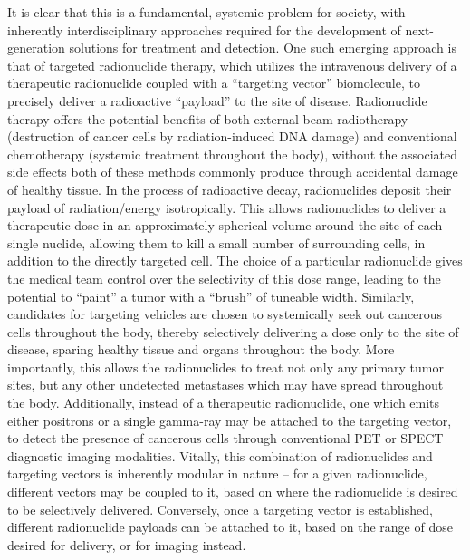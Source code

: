 It is clear that this is a fundamental, systemic problem for society, with inherently interdisciplinary approaches required for the development of next-generation solutions for treatment and detection.  One such emerging approach is that of targeted radionuclide therapy, which utilizes the intravenous delivery of a therapeutic radionuclide coupled with a “targeting vector” biomolecule, to precisely deliver a radioactive “payload” to the site of disease. Radionuclide therapy offers the potential benefits of both external beam radiotherapy (destruction of cancer cells by radiation-induced DNA damage) and conventional chemotherapy (systemic treatment throughout the body), without the associated side effects both of these methods commonly produce through accidental damage of healthy tissue.  In the process of radioactive decay, radionuclides deposit their payload of radiation/energy isotropically. This allows radionuclides to deliver a therapeutic dose in an approximately spherical volume around the site of each single nuclide, allowing them to kill a small number of surrounding cells, in addition to the directly targeted cell. The choice of a particular radionuclide gives the medical team control over the selectivity of this dose range, leading to the potential to “paint” a tumor with a “brush” of tuneable width. Similarly, candidates for targeting vehicles are chosen to systemically seek out cancerous cells throughout the body, thereby selectively delivering a dose only to the site of disease, sparing healthy tissue and organs throughout the body. More importantly, this allows the radionuclides to treat not only any primary tumor sites, but any other undetected metastases which may have spread throughout the body. Additionally, instead of a therapeutic radionuclide, one which emits either positrons or a single gamma-ray may be attached to the targeting vector, to detect the presence of cancerous cells through conventional PET or SPECT diagnostic imaging modalities. Vitally, this combination of radionuclides and targeting vectors is inherently modular in nature – for a given radionuclide, different vectors may be coupled to it, based on where the radionuclide is desired to be selectively delivered. Conversely, once a targeting vector is established, different radionuclide payloads can be attached to it, based on the range of dose desired for delivery, or for imaging instead.

